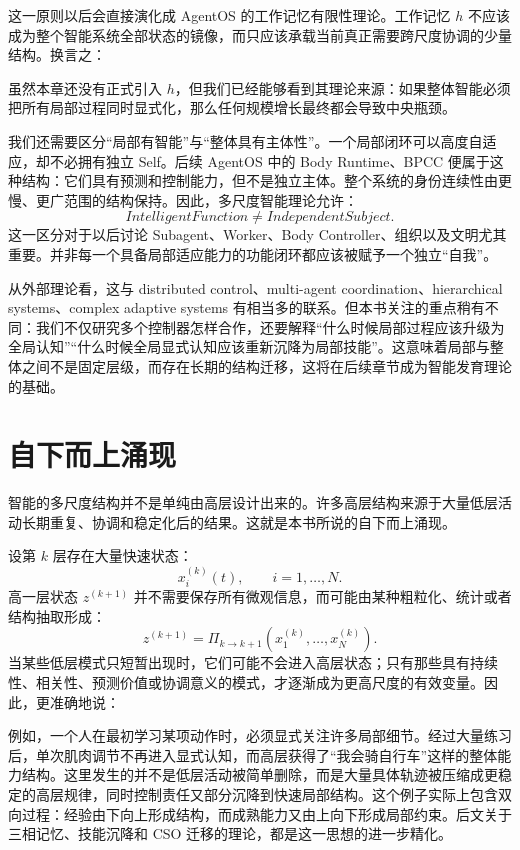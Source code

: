 这一原则以后会直接演化成 AgentOS 的工作记忆有限性理论。工作记忆 $h$ 不应该成为整个智能系统全部状态的镜像，而只应该承载当前真正需要跨尺度协调的少量结构。换言之：
\begin{statementbox}
\centering
{}
\end{statementbox}
虽然本章还没有正式引入 $h$，但我们已经能够看到其理论来源：如果整体智能必须把所有局部过程同时显式化，那么任何规模增长最终都会导致中央瓶颈。

我们还需要区分“局部有智能”与“整体具有主体性”。一个局部闭环可以高度自适应，却不必拥有独立 Self。后续 AgentOS 中的 Body Runtime、BPCC 便属于这种结构：它们具有预测和控制能力，但不是独立主体。整个系统的身份连续性由更慢、更广范围的结构保持。因此，多尺度智能理论允许：
\[
IntelligentFunction
\neq
IndependentSubject.
\]
这一区分对于以后讨论 Subagent、Worker、Body Controller、组织以及文明尤其重要。并非每一个具备局部适应能力的功能闭环都应该被赋予一个独立“自我”。

从外部理论看，这与 distributed control、multi-agent coordination、hierarchical systems、complex adaptive systems 有相当多的联系。但本书关注的重点稍有不同：我们不仅研究多个控制器怎样合作，还要解释“什么时候局部过程应该升级为全局认知”“什么时候全局显式认知应该重新沉降为局部技能”。这意味着局部与整体之间不是固定层级，而存在长期的结构迁移，这将在后续章节成为智能发育理论的基础。

\section{自下而上涌现}

智能的多尺度结构并不是单纯由高层设计出来的。许多高层结构来源于大量低层活动长期重复、协调和稳定化后的结果。这就是本书所说的自下而上涌现。

设第 $k$ 层存在大量快速状态：
\[
x_i^{(k)}(t),
\qquad i=1,\ldots,N.
\]
高一层状态 $z^{(k+1)}$ 并不需要保存所有微观信息，而可能由某种粗粒化、统计或者结构抽取形成：
\[
z^{(k+1)}
=
\Pi_{k\rightarrow k+1}
\left(
x_1^{(k)},
\ldots,
x_N^{(k)}
\right).
\]
当某些低层模式只短暂出现时，它们可能不会进入高层状态；只有那些具有持续性、相关性、预测价值或协调意义的模式，才逐渐成为更高尺度的有效变量。因此，更准确地说：
\begin{statementbox}
\centering
{}
\end{statementbox}

例如，一个人在最初学习某项动作时，必须显式关注许多局部细节。经过大量练习后，单次肌肉调节不再进入显式认知，而高层获得了“我会骑自行车”这样的整体能力结构。这里发生的并不是低层活动被简单删除，而是大量具体轨迹被压缩成更稳定的高层规律，同时控制责任又部分沉降到快速局部结构。这个例子实际上包含双向过程：经验由下向上形成结构，而成熟能力又由上向下形成局部约束。后文关于三相记忆、技能沉降和 CSO 迁移的理论，都是这一思想的进一步精化。


